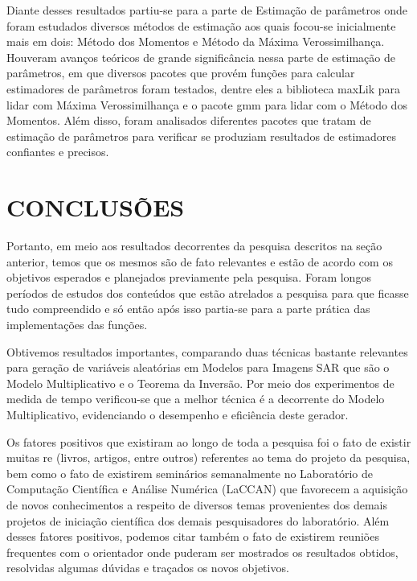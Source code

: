\documentclass[12pt,letterpaper]{article}
\begin{document}
Diante desses resultados partiu-se para a parte de Estimação de parâmetros onde foram estudados diversos métodos de estimação aos quais focou-se inicialmente mais em dois: Método dos Momentos e Método da Máxima Verossimilhança. Houveram avanços teóricos de grande significância nessa parte de estimação de parâmetros, em que diversos pacotes que provém funções para calcular estimadores de parâmetros foram testados, dentre eles a biblioteca maxLik para lidar com Máxima Verossimilhança e o pacote gmm para lidar com o Método dos Momentos. Além disso, foram analisados diferentes pacotes que tratam de estimação de parâmetros para verificar se produziam resultados de estimadores confiantes e precisos.   


\newpage
\section*{\centering \textbf{CONCLUSÕES}} %

Portanto, em meio aos resultados decorrentes da pesquisa descritos na seção anterior, temos que os mesmos são de fato relevantes e estão de acordo com os objetivos esperados e planejados previamente pela pesquisa. Foram longos períodos de estudos dos conteúdos que estão atrelados a pesquisa para que ficasse tudo compreendido e só então após isso partia-se para a parte prática das implementações das funções.

Obtivemos resultados importantes, comparando duas técnicas bastante relevantes para geração de variáveis aleatórias em Modelos para Imagens SAR que são o Modelo Multiplicativo e o Teorema da Inversão. Por meio dos experimentos de medida de tempo verificou-se que a melhor técnica é a decorrente do Modelo Multiplicativo, evidenciando o desempenho e eficiência deste gerador.

Os fatores positivos que existiram ao longo de toda a pesquisa foi o fato de existir muitas re (livros, artigos, entre outros) referentes ao tema do projeto da pesquisa, bem como o fato de existirem seminários semanalmente no Laboratório de Computação Científica e Análise Numérica (LaCCAN) que favorecem a aquisição de novos conhecimentos a respeito de diversos temas provenientes dos demais projetos de
iniciação científica dos demais pesquisadores do laboratório. Além desses fatores positivos, podemos citar também o fato de existirem reuniões frequentes com o orientador onde puderam ser mostrados os resultados obtidos, resolvidas algumas dúvidas e traçados os novos objetivos.
\end{document}
